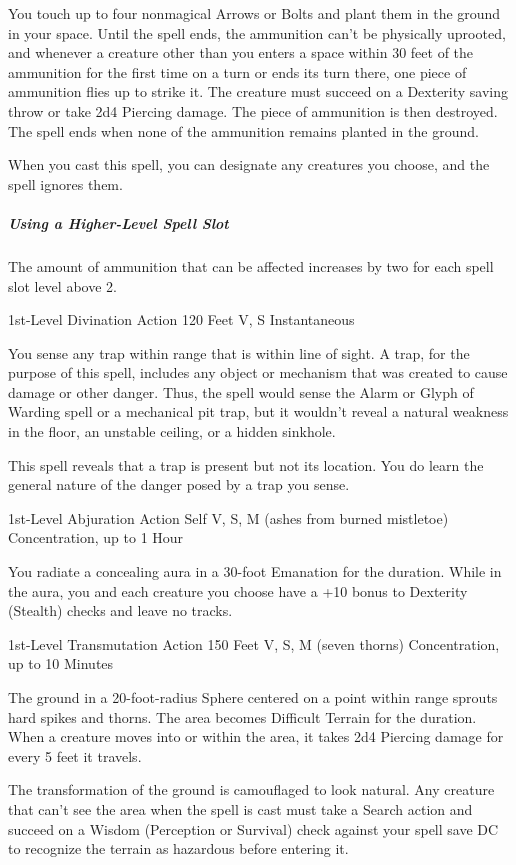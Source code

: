 \documentclass[letterpaper,openany,oneside,twocolumn]{book}
\begin{document}
You touch up to four nonmagical Arrows or Bolts and plant them in the ground in your space. Until the spell ends, the ammunition can't be physically uprooted, and whenever a creature other than you enters a space within 30 feet of the ammunition for the first time on a turn or ends its turn there, one piece of ammunition flies up to strike it. The creature must succeed on a Dexterity saving throw or take 2d4 Piercing damage. The piece of ammunition is then destroyed. The spell ends when none of the ammunition remains planted in the ground.

When you cast this spell, you can designate any creatures you choose, and the spell ignores them.

\subparagraph*{Using a Higher-Level Spell Slot} The amount of ammunition that can be affected increases by two for each spell slot level above 2.

	{1st-Level Divination}
	{Action}
	{120 Feet}
	{V, S}
	{Instantaneous}

You sense any trap within range that is within line of sight. A trap, for the purpose of this spell, includes any object or mechanism that was created to cause damage or other danger. Thus, the spell would sense the Alarm or Glyph of Warding spell or a mechanical pit trap, but it wouldn't reveal a natural weakness in the floor, an unstable ceiling, or a hidden sinkhole.

This spell reveals that a trap is present but not its location. You do learn the general nature of the danger posed by a trap you sense.

	{1st-Level Abjuration}
	{Action}
	{Self}
	{V, S, M (ashes from burned mistletoe)}
	{Concentration, up to 1 Hour}

You radiate a concealing aura in a 30-foot Emanation for the duration. While in the aura, you and each creature you choose have a +10 bonus to Dexterity (Stealth) checks and leave no tracks.

	{1st-Level Transmutation}
	{Action}
	{150 Feet}
	{V, S, M (seven thorns)}
	{Concentration, up to 10 Minutes}

The ground in a 20-foot-radius Sphere centered on a point within range sprouts hard spikes and thorns. The area becomes Difficult Terrain for the duration. When a creature moves into or within the area, it takes 2d4 Piercing damage for every 5 feet it travels.

The transformation of the ground is camouflaged to look natural. Any creature that can't see the area when the spell is cast must take a Search action and succeed on a Wisdom (Perception or Survival) check against your spell save DC to recognize the terrain as hazardous before entering it.
\end{document}
